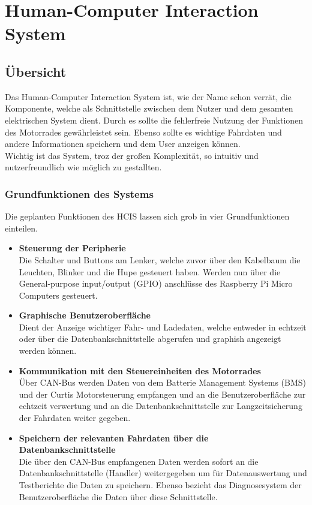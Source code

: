 

\chapter{Human-Computer Interaction System}

\section{Übersicht}
Das Human-Computer Interaction System ist, wie der Name schon verrät, die Komponente, welche als Schnittstelle zwischen dem Nutzer und dem gesamten elektrischen System dient. Durch es sollte die fehlerfreie Nutzung der Funktionen des Motorrades gewährleistet sein. Ebenso sollte es wichtige Fahrdaten und andere Informationen speichern und dem User anzeigen können.\\
Wichtig ist das System, troz der großen Komplexität, so intuitiv und nutzerfreundlich wie möglich zu gestallten.

\subsection{Grundfunktionen des Systems}
Die geplanten Funktionen des HCIS lassen sich grob in vier Grundfunktionen einteilen.
\begin{itemize}
	\item \textbf{Steuerung der Peripherie} \medskip\\
	Die Schalter und Buttons am Lenker, welche zuvor über den Kabelbaum die Leuchten, Blinker und die Hupe gesteuert haben. Werden nun über die General-purpose input/output (GPIO) anschlüsse des Raspberry Pi Micro Computers gesteuert.
	\item \textbf{Graphische Benutzeroberfläche}\medskip\\
Dient der Anzeige wichtiger Fahr- und Ladedaten, welche entweder in echtzeit oder über die Datenbankschnittstelle abgerufen und graphish angezeigt werden können.
	\item \textbf{Kommunikation mit den Steuereinheiten des Motorrades} \medskip\\
	Über CAN-Bus werden Daten von dem Batterie Management Systems (BMS) und der Curtis Motorsteuerung empfangen und an die Benutzeroberfläche zur echtzeit verwertung und an die Datenbankschnittstelle zur Langzeitsicherung der Fahrdaten weiter gegeben.
	\item \textbf{Speichern der relevanten Fahrdaten über die Datenbankschnittstelle} \medskip\\
Die über den CAN-Bus empfangenen Daten werden sofort an die Datenbankschnittstelle (Handler) weitergegeben um für Datenauswertung und Testberichte die Daten zu speichern. Ebenso bezieht das Diagnosesystem der Benutzeroberfläche die Daten über diese Schnittstelle.
\end{itemize}
\newpage


